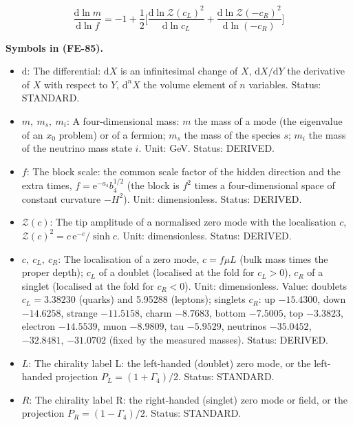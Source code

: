 \documentclass[
  10pt,
]{article}
\providecommand{\tightlist}{%
  \setlength{\itemsep}{0pt}\setlength{\parskip}{0pt}}
\begin{document}
\[
\frac{\mathrm{d}\ln m}{\mathrm{d}\ln f} = -1 +
 \frac12\Big[\frac{\mathrm{d}\ln\mathcal{Z}(c_L)^2}{\mathrm{d}\ln c_L}
 + \frac{\mathrm{d}\ln\mathcal{Z}(-c_R)^2}{\mathrm{d}\ln(-c_R)}\Big] \tag{FE-85}
\]

\textbf{Symbols in (FE-85).}

\begin{itemize}
\tightlist
\item
  \(\mathrm{d}\): The differential: \(\mathrm{d}X\) is an infinitesimal
  change of \(X\), \(\mathrm{d}X/\mathrm{d}Y\) the derivative of \(X\)
  with respect to \(Y\), \(\mathrm{d}^nX\) the volume element of \(n\)
  variables. Status: STANDARD.
\item
  \(m,\ m_s,\ m_i\): A four-dimensional mass: \(m\) the mass of a mode
  (the eigenvalue of an \(x_0\) problem) or of a fermion; \(m_s\) the
  mass of the species \(s\); \(m_i\) the mass of the neutrino mass state
  \(i\). Unit: GeV. Status: DERIVED.
\item
  \(f\): The block scale: the common scale factor of the hidden
  direction and the extra times, \(f = \mathrm{e}^{-a_4}b_4^{1/2}\) (the
  block is \(f^2\) times a four-dimensional space of constant curvature
  \(-H^2\)). Unit: dimensionless. Status: DERIVED.
\item
  \(\mathcal{Z}(c)\): The tip amplitude of a normalised zero mode with
  the localisation \(c\),
  \(\mathcal{Z}(c)^2 = c\,\mathrm{e}^{-c}/\sinh c\). Unit:
  dimensionless. Status: DERIVED.
\item
  \(c,\ c_L,\ c_R\): The localisation of a zero mode, \(c = f\mu L\)
  (bulk mass times the proper depth); \(c_L\) of a doublet (localised at
  the fold for \(c_L > 0\)), \(c_R\) of a singlet (localised at the fold
  for \(c_R < 0\)). Unit: dimensionless. Value: doublets
  \(c_L = 3.38230\) (quarks) and 5.95288 (leptons); singlets \(c_R\): up
  \(-15.4300\), down \(-14.6258\), strange \(-11.5158\), charm
  \(-8.7683\), bottom \(-7.5005\), top \(-3.3823\), electron
  \(-14.5539\), muon \(-8.9809\), tau \(-5.9529\), neutrinos
  \(-35.0452\), \(-32.8481\), \(-31.0702\) (fixed by the measured
  masses). Status: DERIVED.
\item
  \(L\): The chirality label L: the left-handed (doublet) zero mode, or
  the left-handed projection \(P_L = (1 + \Gamma_4)/2\). Status:
  STANDARD.
\item
  \(R\): The chirality label R: the right-handed (singlet) zero mode or
  field, or the projection \(P_R = (1 - \Gamma_4)/2\). Status: STANDARD.
\end{itemize}
\end{document}
